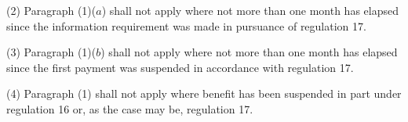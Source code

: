 \documentclass[12pt,a4paper]{article}
\begin{document}
(2) Paragraph (1)($a$) shall not apply where not more than one month has elapsed since the information requirement was made in pursuance of regulation 17.

(3) Paragraph (1)($b$) shall not apply where not more than one month has elapsed since the first payment was suspended in accordance with regulation 17.

(4) Paragraph (1) shall not apply where benefit has been suspended in part under regulation 16 or, as the case may be, regulation 17.

%
%
%
%
%
%
%
\end{document}
